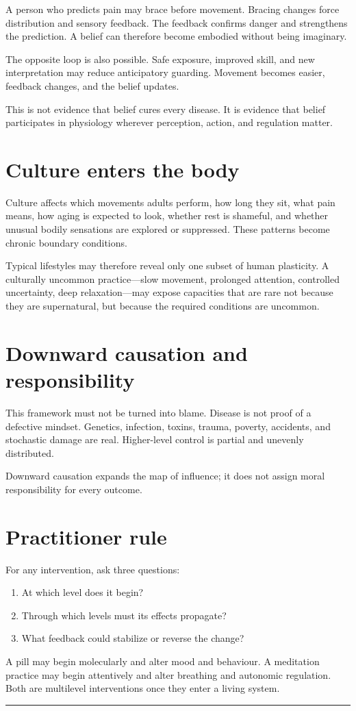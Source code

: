 A person who predicts pain may brace before movement. Bracing changes force distribution and sensory feedback. The feedback confirms danger and strengthens the prediction. A belief can therefore become embodied without being imaginary.

The opposite loop is also possible. Safe exposure, improved skill, and new interpretation may reduce anticipatory guarding. Movement becomes easier, feedback changes, and the belief updates.

This is not evidence that belief cures every disease. It is evidence that belief participates in physiology wherever perception, action, and regulation matter.

\section{Culture enters the body}

Culture affects which movements adults perform, how long they sit, what pain means, how aging is expected to look, whether rest is shameful, and whether unusual bodily sensations are explored or suppressed. These patterns become chronic boundary conditions.

Typical lifestyles may therefore reveal only one subset of human plasticity. A culturally uncommon practice---slow movement, prolonged attention, controlled uncertainty, deep relaxation---may expose capacities that are rare not because they are supernatural, but because the required conditions are uncommon.

\section{Downward causation and responsibility}

This framework must not be turned into blame. Disease is not proof of a defective mindset. Genetics, infection, toxins, trauma, poverty, accidents, and stochastic damage are real. Higher-level control is partial and unevenly distributed.

Downward causation expands the map of influence; it does not assign moral responsibility for every outcome.

\section{Practitioner rule}

For any intervention, ask three questions:

\begin{enumerate}
\def\labelenumi{\arabic{enumi}.}
\tightlist
\item
  At which level does it begin?
\item
  Through which levels must its effects propagate?
\item
  What feedback could stabilize or reverse the change?
\end{enumerate}

A pill may begin molecularly and alter mood and behaviour. A meditation practice may begin attentively and alter breathing and autonomic regulation. Both are multilevel interventions once they enter a living system.

\begin{center}\rule{0.5\linewidth}{0.5pt}\end{center}
